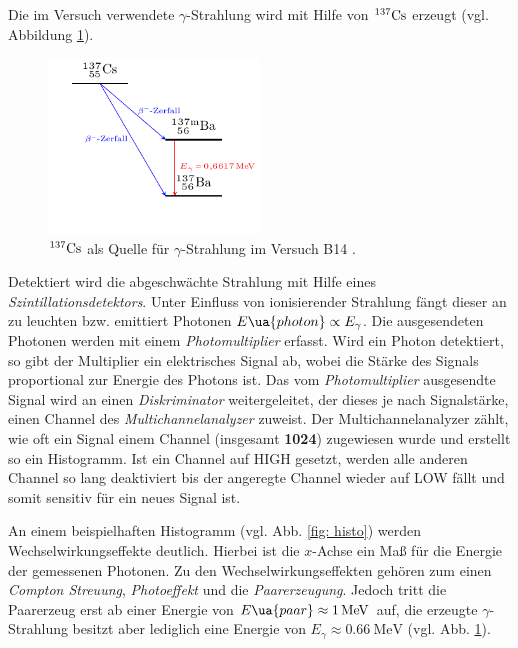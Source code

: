 Die im Versuch verwendete $\gamma$-Strahlung wird mit Hilfe von $^{137}\ce{Cs}$ erzeugt (vgl. Abbildung \ref{fig: zerfall}).

\begin{figure}[h]
  \centering
  \includegraphics[width=0.5\textwidth]{pics/tikz-Energieschema.pdf}
  \caption{$^{137}\ce{Cs}$ als Quelle für $\gamma$-Strahlung im Versuch B14 \cite{luckyjosh}.}
  \label{fig: zerfall}
\end{figure}

Detektiert wird die abgeschwächte Strahlung mit Hilfe eines \emph{Szintillationsdetektors}.
Unter Einfluss von ionisierender Strahlung fängt dieser an zu leuchten bzw. emittiert Photonen $E\ua{photon}\propto E_\gamma$.
Die ausgesendeten Photonen werden mit einem \emph{Photomultiplier} erfasst. Wird ein Photon detektiert,
so gibt der Multiplier ein elektrisches Signal ab, wobei die Stärke des Signals proportional zur Energie des Photons ist.
Das vom \emph{Photomultiplier} ausgesendte Signal
wird an einen \emph{Diskriminator} weitergeleitet, der dieses je nach Signalstärke, einen Channel des
\emph{Multichannelanalyzer} zuweist. Der Multichannelanalyzer zählt, wie oft ein Signal einem Channel (insgesamt \textbf{1024}) zugewiesen wurde und
erstellt so ein Histogramm. Ist ein Channel auf HIGH gesetzt, werden alle anderen Channel so lang deaktiviert
bis der angeregte Channel wieder auf LOW fällt und somit sensitiv für ein neues Signal ist.

An einem beispielhaften Histogramm (vgl. Abb. \ref{fig: histo}) werden Wechselwirkungseffekte deutlich.
Hierbei ist die $x$-Achse ein Maß für die Energie der gemessenen Photonen.
Zu den Wechselwirkungseffekten gehören zum einen \emph{Compton Streuung}, \emph{Photoeffekt} und die \emph{Paarerzeugung}.
Jedoch tritt die Paarerzeug erst ab einer Energie von $E\ua{paar}\approx \SI{1}{\mega\eV}$ auf, die erzeugte $\gamma$-Strahlung
besitzt aber lediglich eine Energie von $E_{\gamma}\approx\SI{0.66}{\mega\eV}$ (vgl. Abb. \ref{fig: zerfall}).

